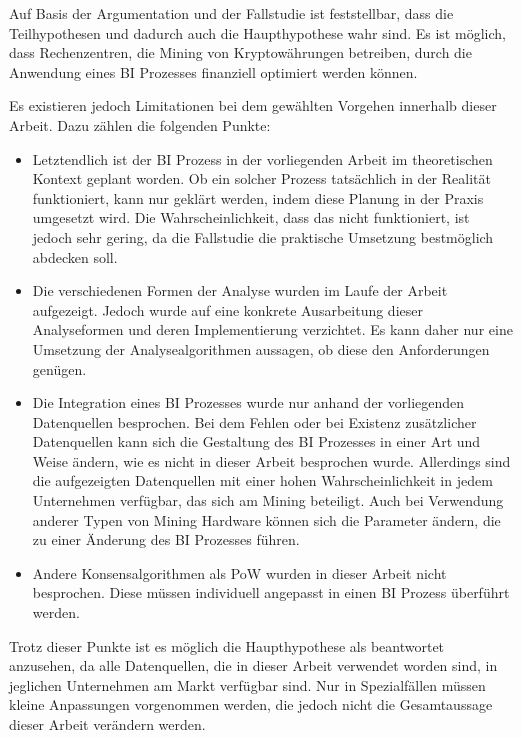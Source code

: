 Auf Basis der Argumentation und der Fallstudie ist feststellbar, dass die Teilhypothesen und dadurch auch die Haupthypothese
wahr sind. Es ist möglich, dass Rechenzentren, die Mining von Kryptowährungen betreiben, durch die Anwendung eines \ac{BI}
Prozesses finanziell optimiert werden können.

Es existieren jedoch Limitationen bei dem gewählten Vorgehen innerhalb dieser Arbeit. Dazu zählen die folgenden Punkte:
\begin{itemize}
    \item Letztendlich ist der \ac{BI} Prozess in der vorliegenden Arbeit im theoretischen Kontext geplant worden. Ob ein
    solcher Prozess tatsächlich in der Realität funktioniert, kann nur geklärt werden, indem diese Planung in der Praxis
    umgesetzt wird. Die Wahrscheinlichkeit, dass das nicht funktioniert, ist jedoch sehr gering, da die Fallstudie
    die praktische Umsetzung bestmöglich abdecken soll.
    \item Die verschiedenen Formen der Analyse wurden im Laufe der Arbeit aufgezeigt. Jedoch wurde auf eine
    konkrete Ausarbeitung dieser Analyseformen und deren Implementierung verzichtet. Es kann daher nur eine Umsetzung der
    Analysealgorithmen aussagen, ob diese den Anforderungen genügen.
    \item Die Integration eines \ac{BI} Prozesses wurde nur anhand der vorliegenden Datenquellen besprochen. Bei dem Fehlen
    oder bei Existenz zusätzlicher Datenquellen kann sich die Gestaltung des \ac{BI} Prozesses in einer Art und Weise
    ändern, wie es nicht in dieser Arbeit besprochen wurde. Allerdings sind die aufgezeigten Datenquellen mit einer
    hohen Wahrscheinlichkeit in jedem Unternehmen verfügbar, das sich am Mining beteiligt. Auch bei Verwendung anderer
    Typen von Mining Hardware können sich die Parameter ändern, die zu einer Änderung des \ac{BI} Prozesses führen.
    \item Andere Konsensalgorithmen als \ac{PoW} wurden in dieser Arbeit nicht besprochen. Diese müssen individuell angepasst
    in einen \ac{BI} Prozess überführt werden.
\end{itemize}

Trotz dieser Punkte ist es möglich die Haupthypothese als beantwortet anzusehen, da alle Datenquellen, die in dieser
Arbeit verwendet worden sind, in jeglichen Unternehmen am Markt verfügbar sind. Nur in Spezialfällen müssen
kleine Anpassungen vorgenommen werden, die jedoch nicht die Gesamtaussage dieser Arbeit verändern werden.

